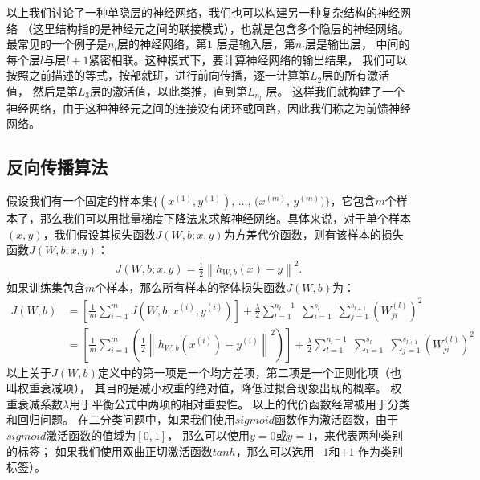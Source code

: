 以上我们讨论了一种单隐层的神经网络，我们也可以构建另一种复杂结构的神经网络
（这里结构指的是神经元之间的联接模式），也就是包含多个隐层的神经网络。
最常见的一个例子是$n_l$层的神经网络，第$1$ 层是输入层，第$n_l$层是输出层，
中间的每个层$l$与层$l+1$紧密相联。这种模式下，要计算神经网络的输出结果，
我们可以按照之前描述的等式，按部就班，进行前向传播，逐一计算第$L_2$层的所有激活值，
然后是第$L_3$层的激活值，以此类推，直到第$L_{n_l}$ 层。
这样我们就构建了一个神经网络，由于这种神经元之间的连接没有闭环或回路，因此我们称之为前馈神经网络。\par

\subsection{反向传播算法}
假设我们有一个固定的样本集$\{ (x^{(1)}, y^{(1)})$, $\ldots$, $(x^{(m)}$, $y^{(m)}) \}$，它包含$m$个样本了，那么我们可以用批量梯度下降法来求解神经网络。具体来说，对于单个样本$(x,y)$，我们假设其损失函数$J(W,b; x,y)$为方差代价函数，则有该样本的损失函数$J(W,b; x,y)$：
\begin{align}
	J(W,b; x,y) = \frac{1}{2} \left\| h_{W,b}(x) - y \right\|^2.
\end{align}
如果训练集包含$m$个样本，那么所有样本的整体损失函数$J(W,b)$为：
\begin{equation}
	\begin{aligned}
	J(W,b)
	&= \left[ \frac{1}{m} \sum_{i=1}^m J(W,b;x^{(i)},y^{(i)}) \right]
	+ \frac{\lambda}{2} \sum_{l=1}^{n_l-1} \; \sum_{i=1}^{s_l} \; \sum_{j=1}^{s_{l+1}} \left( W^{(l)}_{ji} \right)^2
	\\
	&= \left[ \frac{1}{m} \sum_{i=1}^m \left( \frac{1}{2} \left\| h_{W,b}(x^{(i)}) - y^{(i)} \right\|^2 \right) \right]
	+ \frac{\lambda}{2} \sum_{l=1}^{n_l-1} \; \sum_{i=1}^{s_l} \; \sum_{j=1}^{s_{l+1}} \left( W^{(l)}_{ji} \right)^2
	\end{aligned}
\end{equation}
以上关于$J(W,b)$定义中的第一项是一个均方差项，第二项是一个正则化项（也叫权重衰减项），
其目的是减小权重的绝对值，降低过拟合现象出现的概率。
权重衰减系数$\lambda$用于平衡公式中两项的相对重要性。
以上的代价函数经常被用于分类和回归问题。
在二分类问题中，如果我们使用$sigmoid$函数作为激活函数，由于$sigmoid$激活函数的值域为$[0,1]$，
那么可以使用$y=0$或$y=1$，来代表两种类别的标签；
如果我们使用双曲正切激活函数$tanh$，那么可以选用$-1$和$+1$ 作为类别标签）。\par

